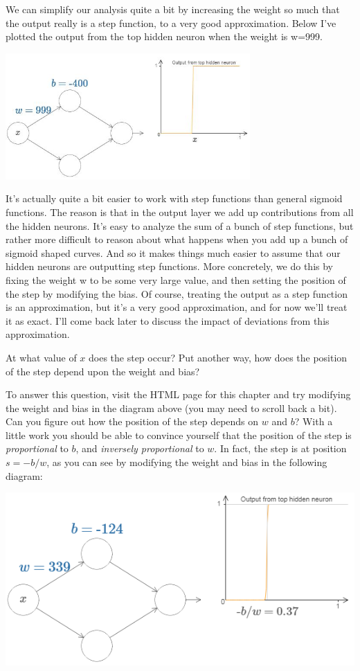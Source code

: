 We can simplify our analysis quite a bit by increasing the weight so much that the output really is a step function, to a very good approximation. Below I've plotted the output from the top hidden neuron when the weight is w=999. 

{\centering \includegraphics[width=0.7\textwidth,]{pic/high_weight_function.jpg} \par}

It's actually quite a bit easier to work with step functions than general sigmoid functions. The reason is that in the output layer we add up contributions from all the hidden neurons. It's easy to analyze the sum of a bunch of step functions, but rather more difficult to reason about what happens when you add up a bunch of sigmoid shaped curves. And so it makes things much easier to assume that our hidden neurons are outputting step functions. More concretely, we do this by fixing the weight w
to be some very large value, and then setting the position of the step by modifying the bias. Of course, treating the output as a step function is an approximation, but it's a very good approximation, and for now we'll treat it as exact. I'll come back later to discuss the impact of deviations from this approximation.



At what value of $x$ does the step occur? Put another way, how does the position of the step depend upon the weight and bias?

To answer this question, visit the HTML page for this chapter and try modifying the weight and bias in the diagram above (you may need to scroll back a bit). Can you figure out how the position of the step depends on $w$ and $b$? With a little work you should be able to convince yourself that the position of the step is \textit{proportional} to $b$, and \textit{inversely proportional} to $w$.
In fact, the step is at position $s=-b/w$, as you can see by modifying the weight and bias in the following diagram:

{\centering \includegraphics[width=\textwidth,]{pic/wigglyfn09.png} \par}


